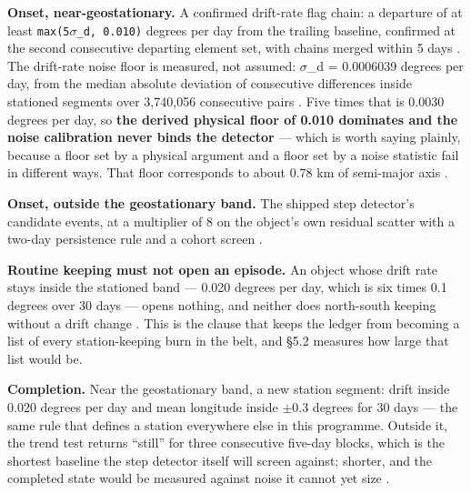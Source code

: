 \documentclass[11pt]{article}
\begin{document}
\textbf{Onset, near-geostationary.} A confirmed drift-rate flag chain: a departure of at least \texttt{max(5$\sigma$\_d, 0.010)} degrees per day from the trailing baseline, confirmed at the second consecutive departing element set, with chains merged within 5 days%
. The drift-rate noise floor is measured, not assumed: $\sigma$\_d = 0.0006039 degrees per day, from the median absolute deviation of consecutive differences inside stationed segments over 3,740,056 consecutive pairs%
. Five times that is 0.0030 degrees per day, so \textbf{the derived physical floor of 0.010 dominates and the noise calibration never binds the detector} --- which is worth saying plainly, because a floor set by a physical argument and a floor set by a noise statistic fail in different ways. That floor corresponds to about 0.78 km of semi-major axis%
.

\textbf{Onset, outside the geostationary band.} The shipped step detector's candidate events, at a multiplier of 8 on the object's own residual scatter with a two-day persistence rule and a cohort screen%
.

\textbf{Routine keeping must not open an episode.} An object whose drift rate stays inside the stationed band --- 0.020 degrees per day, which is six times 0.1 degrees over 30 days --- opens nothing, and neither does north-south keeping without a drift change%
. This is the clause that keeps the ledger from becoming a list of every station-keeping burn in the belt, and \S{}5.2 measures how large that list would be.

\textbf{Completion.} Near the geostationary band, a new station segment: drift inside 0.020 degrees per day and mean longitude inside $\pm$0.3 degrees for 30 days --- the same rule that defines a station everywhere else in this programme. Outside it, the trend test returns ``still'' for three consecutive five-day blocks, which is the shortest baseline the step detector itself will screen against; shorter, and the completed state would be measured against noise it cannot yet size%
.
\end{document}
